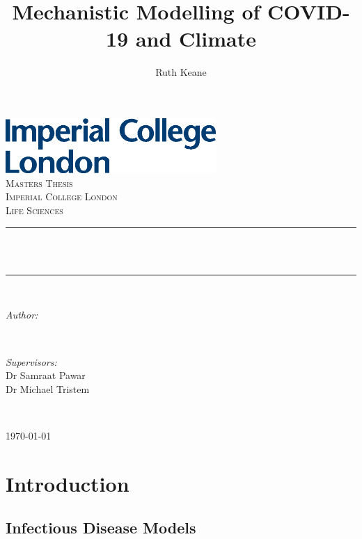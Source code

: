 \documentclass[11pt]{article}
\newcommand{\HRule}{\rule{\linewidth}{1mm}}
\begin{document}
\title{Mechanistic Modelling of COVID-19 and Climate}%
\author{Ruth Keane}

\begin{titlepage}
\includegraphics[width=8cm]{logo.eps}\\[1cm] 
\center 
\textsc{\LARGE Masters Thesis}\\[1.5cm] 
\textsc{\Large Imperial College London}\\[0.5cm]
\textsc{\large Life Sciences}\\[0.5cm] 
\makeatletter
\HRule \\[0.4cm]
{ \huge \bfseries \@title}\\[0.4cm] %
\HRule \\[1.5cm]

\begin{minipage}{0.4\textwidth}
\begin{flushleft} \large
\emph{Author:}\\
\@author %
\end{flushleft}
\end{minipage}
~
\begin{minipage}{0.4\textwidth}
\begin{flushright} \large
\emph{Supervisors:} \\
Dr Samraat Pawar \\[1.2em] %
Dr Michael Tristem\\[1.2em]
\end{flushright}
\end{minipage}\\[2cm]
\makeatother

{\large \today}\\[2cm] %
\vfill %
\clearpage
\end{titlepage}
\tableofcontents
\newpage
\begin{abstract}
\end{abstract}
\linenumbers

\section{Introduction}
\subsection{Infectious Disease Models}
\end{document}
